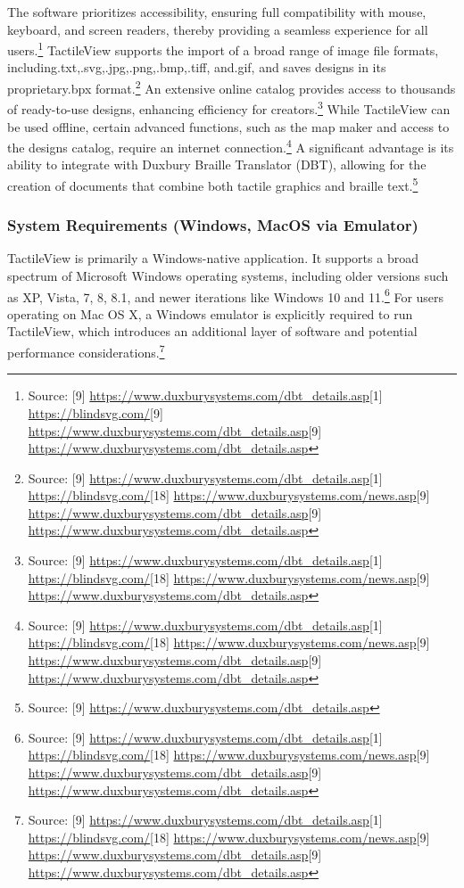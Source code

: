 The software prioritizes accessibility, ensuring full compatibility with mouse, keyboard, and screen readers, thereby providing a seamless experience for all users.\footnote{Source: [9] \url{https://www.duxburysystems.com/dbt_details.asp}[1] \url{https://blindsvg.com/}[9] \url{https://www.duxburysystems.com/dbt_details.asp}[9] \url{https://www.duxburysystems.com/dbt_details.asp}} TactileView supports the import of a broad range of image file formats, including.txt,.svg,.jpg,.png,.bmp,.tiff, and.gif, and saves designs in its proprietary.bpx format.\footnote{Source: [9] \url{https://www.duxburysystems.com/dbt_details.asp}[1] \url{https://blindsvg.com/}[18] \url{https://www.duxburysystems.com/news.asp}[9] \url{https://www.duxburysystems.com/dbt_details.asp}[9] \url{https://www.duxburysystems.com/dbt_details.asp}} An extensive online catalog provides access to thousands of ready-to-use designs, enhancing efficiency for creators.\footnote{Source: [9] \url{https://www.duxburysystems.com/dbt_details.asp}[1] \url{https://blindsvg.com/}[18] \url{https://www.duxburysystems.com/news.asp}[9] \url{https://www.duxburysystems.com/dbt_details.asp}} While TactileView can be used offline, certain advanced functions, such as the map maker and access to the designs catalog, require an internet connection.\footnote{Source: [9] \url{https://www.duxburysystems.com/dbt_details.asp}[1] \url{https://blindsvg.com/}[18] \url{https://www.duxburysystems.com/news.asp}[9] \url{https://www.duxburysystems.com/dbt_details.asp}[9] \url{https://www.duxburysystems.com/dbt_details.asp}} A significant advantage is its ability to integrate with Duxbury Braille Translator (DBT), allowing for the creation of documents that combine both tactile graphics and braille text.\footnote{Source: [9] \url{https://www.duxburysystems.com/dbt_details.asp}}

\subsubsection{System Requirements (Windows, MacOS via Emulator)}

TactileView is primarily a Windows-native application. It supports a broad spectrum of Microsoft Windows operating systems, including older versions such as XP, Vista, 7, 8, 8.1, and newer iterations like Windows 10 and 11.\footnote{Source: [9] \url{https://www.duxburysystems.com/dbt_details.asp}[1] \url{https://blindsvg.com/}[18] \url{https://www.duxburysystems.com/news.asp}[9] \url{https://www.duxburysystems.com/dbt_details.asp}[9] \url{https://www.duxburysystems.com/dbt_details.asp}} For users operating on Mac OS X, a Windows emulator is explicitly required to run TactileView, which introduces an additional layer of software and potential performance considerations.\footnote{Source: [9] \url{https://www.duxburysystems.com/dbt_details.asp}[1] \url{https://blindsvg.com/}[18] \url{https://www.duxburysystems.com/news.asp}[9] \url{https://www.duxburysystems.com/dbt_details.asp}[9] \url{https://www.duxburysystems.com/dbt_details.asp}}

